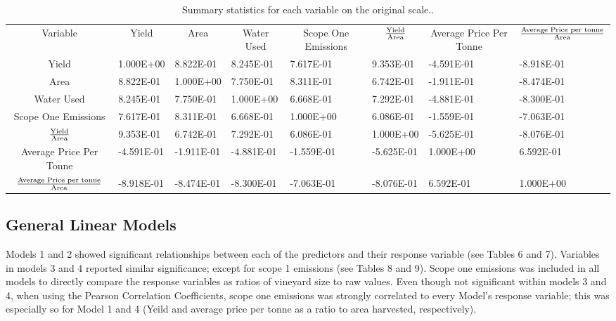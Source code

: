 \documentclass[12pt,australian]{article}
\begin{document}
\begin{sloppypar}
    \begin{table}[]
      \caption{Summary statistics for each variable on the original scale..}
      \label{tab:tab5}
      \begin{tabular}{clllllll}
      Variable &
        \multicolumn{1}{c}{Yield} &
        \multicolumn{1}{c}{Area} &
        \multicolumn{1}{c}{Water Used} &
        \multicolumn{1}{c}{Scope One Emissions} &
        \multicolumn{1}{c}{$\text{Yield}\over\text{Area}$} &
        \multicolumn{1}{c}{Average Price Per Tonne} &
        \multicolumn{1}{c}{${\text{Average Price per tonne}\over\text{Area}}$} \\
      Yield                                              & 1.000E+00  & 8.822E-01  & 8.245E-01  & 7.617E-01  & 9.353E-01  & -4.591E-01 & -8.918E-01 \\
      Area                                               & 8.822E-01  & 1.000E+00  & 7.750E-01  & 8.311E-01  & 6.742E-01  & -1.911E-01 & -8.474E-01 \\
      Water Used                                         & 8.245E-01  & 7.750E-01  & 1.000E+00  & 6.668E-01  & 7.292E-01  & -4.881E-01 & -8.300E-01 \\
      Scope One Emissions                                & 7.617E-01  & 8.311E-01  & 6.668E-01  & 1.000E+00  & 6.086E-01  & -1.559E-01 & -7.063E-01 \\
      $\text{Yield}\over\text{Area}$                     & 9.353E-01  & 6.742E-01  & 7.292E-01  & 6.086E-01  & 1.000E+00  & -5.625E-01 & -8.076E-01 \\
      Average Price Per Tonne                            & -4.591E-01 & -1.911E-01 & -4.881E-01 & -1.559E-01 & -5.625E-01 & 1.000E+00  & 6.592E-01  \\
      ${\text{Average Price per tonne}\over\text{Area}}$ & -8.918E-01 & -8.474E-01 & -8.300E-01 & -7.063E-01 & -8.076E-01 & 6.592E-01  & 1.000E+00 
      \end{tabular}
      \end{table}

\subsection{General Linear Models}
Models 1 and 2 showed significant relationships between each of the predictors and their response variable (see Tables 6 and 7). Variables in models 3 and 4 reported similar significance; except for scope 1 emissions (see Tables 8 and 9). Scope one emissions was included in all models to directly compare the response variables as ratios of vineyard size to raw values. Even though not significant within models 3 and 4, when using the Pearson Correlation Coefficients, scope one emissions was strongly correlated to every Model's response variable; this was especially so for Model 1 and 4 (Yeild and average price per tonne as a ratio to area harvested, respectively).


\end{sloppypar}
\end{document}
